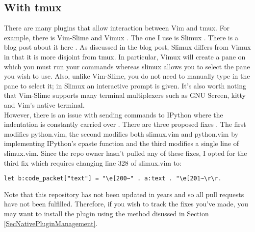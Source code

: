 \documentclass[10pt]{article}
\begin{document}
\subsection{With tmux}
There are many plugins that allow interaction between Vim and tmux. For example, there is Vim-Slime
\cite{jpalardy2012slime} and Vimux \cite{benmills2009vimux}. The one I use is Slimux \cite{esamattis2015slimux}. There
is a blog post about it here \cite{suuronen2012slimux}. As discussed in the blog post, Slimux differs from Vimux in
that it is more disjoint from tmux. In particular, Vimux will create a pane on which you must run your commands whereas
slimux allows you to select the pane you wish to use. Also, unlike Vim-Slime, you do not need to manually type in the
pane to select it; in Slimux an interactive prompt is given. It's also worth noting that Vim-Slime supports many
terminal multiplexers such as GNU Screen, kitty and Vim's native terminal.\\

However, there is an issue with sending commands to IPython where the indentation is constantly carried over
\cite{kmARC2015indentationerror}. There are three proposed fixes
\cite{lotabout2017remove,karadaharu2016add,zcesur2018fix}. The first modifies python.vim, the second modifies both
slimux.vim and python.vim by implementing IPython's cpaste function and the third modifies a single line of slimux.vim.
Since the repo owner hasn't pulled any of these fixes, I opted for the third fix which requires changing line 328 of
slimux.vim to:
\begin{lstlisting}
let b:code_packet["text"] = "\e[200~" . a:text . "\e[201~\r\r.
\end{lstlisting}
Note that this repository has not been updated in years and so all pull requests have not been fulfilled. Therefore, if
you wish to track the fixes you've made, you may want to install the plugin using the method disussed in Section
\ref{SecNativePluginManagement}.

\end{document}

